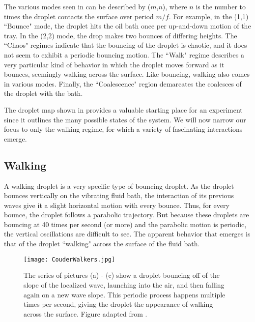 The various modes seen in  can be described by ($m$,$n$), where $n$ is the number to times the droplet contacts the surface over period $m/f$. For example, in the (1,1) ``Bounce" mode, the droplet hits the oil bath once per up-and-down motion of the tray. In the (2,2) mode, the drop makes two bounces of differing heights. The ``Chaos" regimes indicate that the bouncing of the droplet is chaotic, and it does not seem to exhibit a periodic bouncing motion. The ``Walk" regime describes a very particular kind of behavior in which the droplet moves forward as it bounces, seemingly walking across the surface. Like bouncing, walking also comes in various modes. Finally, the ``Coalescence" region demarcates the coalesces of the droplet with the bath.

The droplet map shown in  provides a valuable starting place for an experiment since it outlines the many possible states of the system. We will now narrow our focus to only the walking regime, for which a variety of fascinating interactions emerge.

	        \subsection{Walking}
A walking droplet is a very specific type of bouncing droplet. As the droplet bounces vertically on the vibrating fluid bath, the interaction of its previous waves give it a slight horizontal motion with every bounce. Thus, for every bounce, the droplet follows a parabolic trajectory. But because these droplets are bouncing at 40 times per second (or more) and the parabolic motion is periodic, the vertical oscillations are difficult to see. The apparent behavior that emerges is that of the droplet ``walking" across the surface of the fluid bath.             

 \begin{figure}[h]
	       \centering
	    \texttt{[image: CouderWalkers.jpg]}
	     \caption{The series of pictures (a) - (c) show a droplet bouncing off of the slope of the localized wave, launching into the air, and then falling again on a new wave slope. This periodic process happens multiple times per second, giving the droplet the appearance of walking across the surface. Figure adapted from .}
	 \label{Couderwalkers}
	\end{figure}
 
